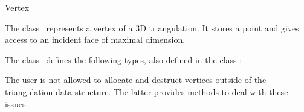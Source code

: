 

\begin{ccRefClass}{Vertex}  %


\ccDefinition
  
The class \ccRefName\ represents a vertex of a 3D triangulation. 
It stores a point and gives access to an incident face of 
maximal dimension.


\ccInheritsFrom
{}

\ccTypes
{}
\ccThreeToTwo
The class \ccClassTemplateName\ defines the following types, also
defined in the class :

\ccGlue
{}
\ccGlue
{}


\begin{ccAdvanced}
\ccCreation

The user is not allowed to allocate and destruct vertices outside of the
triangulation data structure. The latter provides methods to deal with these
issues. 




\end{ccAdvanced}
\end{ccRefClass}
